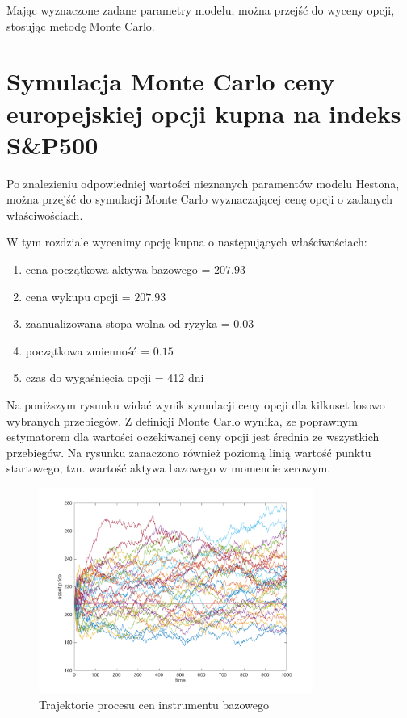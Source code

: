 \documentclass{pracamgr}
\begin{document}
{Mając wyznaczone zadane parametry modelu, można przejść do wyceny opcji, stosując metodę Monte Carlo.


\section{Symulacja Monte Carlo ceny europejskiej opcji kupna na indeks S\&P500}

Po znalezieniu odpowiedniej wartości nieznanych paramentów modelu Hestona, można 
przejść do symulacji Monte Carlo wyznaczającej cenę opcji o zadanych właściwościach.

W tym rozdziale wycenimy opcję kupna o następujących właściwościach:
\begin{enumerate}
  \item cena początkowa aktywa bazowego = $207.93$
  \item cena wykupu opcji = $207.93$ 
  \item zaanualizowana stopa wolna od ryzyka = $0.03$
  \item początkowa zmienność =  $0.15$
  \item czas do wygaśnięcia opcji = 412 dni
\end{enumerate}
 
Na poniższym rysunku widać wynik symulacji ceny opcji dla kilkuset losowo wybranych przebiegów.
Z definicji Monte Carlo wynika, ze poprawnym estymatorem dla wartości oczekiwanej ceny
opcji jest średnia ze wszystkich przebiegów.
Na rysunku zanaczono również poziomą linią wartość punktu startowego, tzn. wartość 
aktywa bazowego w momencie zerowym.

\begin{figure}
\centering
  \includegraphics[width=0.80\textwidth]{../chartHeston.png}
  \caption{Trajektorie procesu cen instrumentu bazowego}
  \label{fig:hestonAssetPaths}
\end{figure}


}
\end{document}
